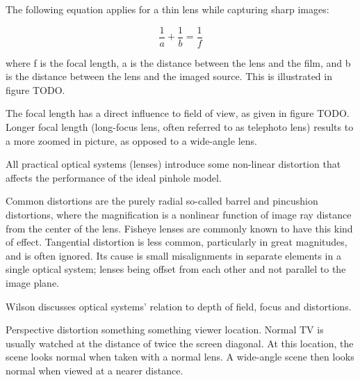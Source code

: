 The following equation applies for a thin lens while capturing sharp images:

\begin{equation}
	\frac{1}{a} + \frac{1}{b} = \frac{1}{f} \label{eq:focal}
\end{equation}

where f is the focal length, a is the distance between the lens and the film, and b is the distance between the lens and the imaged source. This is illustrated in figure TODO.

The focal length has a direct influence to field of view, as given in figure TODO. Longer focal length (long-focus lens, often referred to as telephoto lens) results to a more zoomed in picture, as opposed to a wide-angle lens. 

All practical optical systems (lenses) introduce some non-linear distortion that affects the performance of the ideal pinhole model.

Common distortions are the purely radial so-called barrel and pincushion distortions, where the magnification is a nonlinear function of image ray distance from the center of the lens.
Fisheye lenses are commonly known to have this kind of effect.
Tangential distortion is less common, particularly in great magnitudes, and is often ignored. Its cause is small misalignments in separate elements in a single optical system; lenses being offset from each other and not parallel to the image plane.

Wilson \cite{wilson2004anton} discusses optical systems' relation to depth of field, focus and distortions.

Perspective distortion something something viewer location. Normal TV is usually watched at the distance of twice the screen diagonal. At this location, the scene looks normal when taken with a normal lens. A wide-angle scene then looks normal when viewed at a nearer distance. \cite{wilson2004anton}



